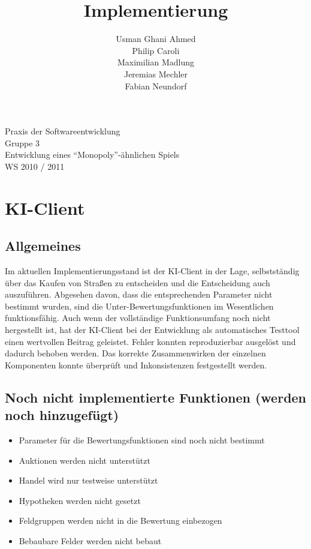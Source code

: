 \documentclass[a4paper,10pt]{article}
\title{Implementierung}
\date{}
\author{Usman Ghani Ahmed \\
Philip Caroli\\
Maximilian Madlung\\ 
Jeremias Mechler\\ 
Fabian Neundorf}
\begin{document}
 
\vspace{5cm}
\maketitle
\begin{center}
\vspace{3cm}
\huge{Praxis der Softwareentwicklung \\
Gruppe 3 \\[0.5cm]
Entwicklung eines "`Monopoly"'-ähnlichen Spiels \\[0.5cm]
WS 2010 / 2011} \\[2cm]
\end{center}

\newpage

\tableofcontents

\newpage

\section{KI-Client}

\subsection{Allgemeines}
Im aktuellen Implementierungsstand ist der KI-Client in der Lage, selbstständig über das Kaufen von Straßen zu entscheiden und die Entscheidung auch auszuführen. Abgesehen davon, dass die entsprechenden Parameter nicht bestimmt wurden, sind die Unter-Bewertungsfunktionen im Wesentlichen funktionsfähig.
Auch wenn der vollständige Funktionsumfang noch nicht hergestellt ist, hat der KI-Client bei der Entwicklung als automatisches Testtool einen wertvollen Beitrag geleistet. Fehler konnten reproduzierbar ausgelöst und dadurch behoben werden. Das korrekte Zusammenwirken der einzelnen Komponenten konnte überprüft und Inkonsistenzen festgestellt werden.
\subsection{Noch nicht implementierte Funktionen (werden noch hinzugefügt)}
\begin{itemize}
\item Parameter für die Bewertungsfunktionen sind noch nicht bestimmt
\item Auktionen werden nicht unterstützt
\item Handel wird nur testweise unterstützt
\item Hypotheken werden nicht gesetzt
\item Feldgruppen werden nicht in die Bewertung einbezogen
\item Bebaubare Felder werden nicht bebaut
\end{itemize}
\end{document}
